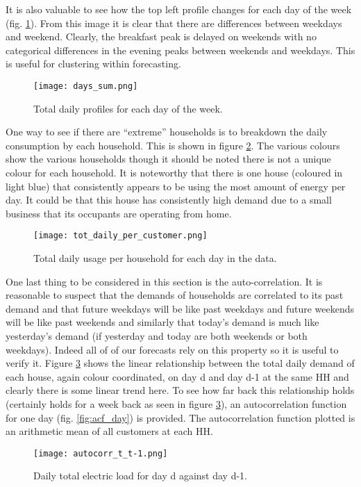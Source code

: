 \documentclass[a4paper]{article}
\begin{document}
It is also valuable to see how the top left profile changes for each day of the week (fig. \ref{fig:days}). From this image it is clear that there are differences between weekdays and weekend. Clearly, the breakfast peak is delayed on weekends with no categorical differences in the evening peaks between weekends and weekdays. This is useful for clustering within forecasting.

\begin{figure}
\centering
\texttt{[image: days\_sum.png]}
\caption{Total daily profiles for each day of the week.}
\label{fig:days} 
\end{figure}

One way to see if there are ``extreme'' households is to breakdown the daily consumption by each household. This is shown in figure \ref{fig:totes}. The various colours show the various households though it should be noted there is not a unique colour for each household. It is noteworthy that there is one house (coloured in light blue) that consistently appears to be using the most amount of energy per day. It could be that this house has consistently high demand due to a small business that its occupants are operating from home.

\begin{figure}
\centering
\texttt{[image: tot\_daily\_per\_customer.png]}
\caption{Total daily usage per household for each day in the data.}
\label{fig:totes}
\end{figure}

One last thing to be considered in this section is the auto-correlation. It is reasonable to suspect that the demands of households are correlated to its past demand and that future weekdays will be like past weekdays and future weekends will be like past weekends and similarly that today's demand is much like yesterday's demand (if yesterday and today are both weekends or both weekdays). Indeed all of of our forecasts rely on this property so it is useful to verify it.  Figure \ref{fig:ty_colour} shows the linear relationship between the total daily demand of each house, again colour coordinated, on day d and day d-1 at the same HH and clearly there is some linear trend here. To see how far back this relationship holds (certainly holds for a week back as seen in figure \ref{fig:ty_colour}), an autocorrelation function for one day (fig. \ref{fig:acf_day}) is provided. The autocorrelation function plotted is an arithmetic mean of all customers at each HH.

\begin{figure}
\centering
\texttt{[image: autocorr\_t\_t-1.png]}
\caption{Daily total electric load for day d against day d-1.}
\label{fig:ty_colour} 
\end{figure}
\end{document}
